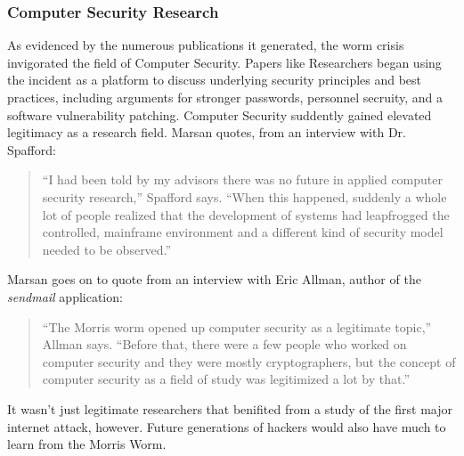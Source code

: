 \subsubsection*{Computer Security Research}
As evidenced by the numerous publications it generated, the worm crisis
invigorated the field of Computer Security.
Papers like
Researchers began using the incident as a platform to discuss
underlying security principles and best practices, including arguments for
stronger passwords, personnel secruity, and a software vulnerability
patching\cite{eichin_microscope_1989}.
Computer Security suddently gained elevated legitimacy as a research field.
Marsan\cite{marsan_morris_2008} quotes, from an interview with Dr. Spafford:
\begin{quote}
``I had been told by my advisors there was no future in applied computer
security research,'' Spafford says. ``When this happened, suddenly a whole lot
of people realized that the development of systems had leapfrogged the
controlled, mainframe environment and a different kind of security model needed
to be observed.''
\end{quote}

Marsan\cite{marsan_morris_2008} goes on to quote from an interview with Eric
Allman, author of the \textit{sendmail} application:
\begin{quote}
``The Morris worm opened up computer security as a legitimate topic,'' Allman
says. ``Before that, there were a few people who worked on computer security
and they were mostly cryptographers, but the concept of computer security as a
field of study was legitimized a lot by that.''
\end{quote}

It wasn't just legitimate researchers that benifited from a study of the first
major internet attack, however. Future generations of hackers would
also have much to learn from the Morris Worm.
    